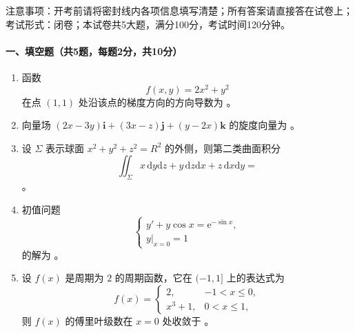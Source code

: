 注意事项：开考前请将密封线内各项信息填写清楚；所有答案请直接答在试卷上；考试形式：闭卷；本试卷共5大题，满分100分，考试时间120分钟。

\paragraph*{一、填空题（共5题，每题2分，共10分）}
\begin{enumerate}
  \item 函数
  \[
    f(x,y)=2x^2+y^2
  \]
  在点 \((1,1)\) 处沿该点的梯度方向的方向导数为 \underline{\hspace{5cm}}。
  \item 向量场 \((2x-3y)\mathbf i+(3x-z)\mathbf j+(y-2x)\mathbf k\) 的旋度向量为 \underline{\hspace{5cm}}。
  \item 设 \(\Sigma\) 表示球面 \(x^2+y^2+z^2=R^2\) 的外侧，则第二类曲面积分
  \[
    \iint_\Sigma x\,\mathrm{d}y\mathrm{d}z+y\,\mathrm{d}z\mathrm{d}x+z\,\mathrm{d}x\mathrm{d}y=
  \]
  \underline{\hspace{5cm}}。
  \item 初值问题
  \[
    \begin{cases}
      y'+y\cos x=\mathrm{e}^{-\sin x},\\
      y|_{x=0}=1
    \end{cases}
  \]
  的解为 \underline{\hspace{5cm}}。
  \item 设 \(f(x)\) 是周期为 \(2\) 的周期函数，它在 \((-1,1]\) 上的表达式为
  \[
    f(x)=
    \begin{cases}
      2, & -1<x\le 0,\\
      x^3+1, & 0<x\le 1,
    \end{cases}
  \]
  则 \(f(x)\) 的傅里叶级数在 \(x=0\) 处收敛于 \underline{\hspace{5cm}}。
\end{enumerate}

